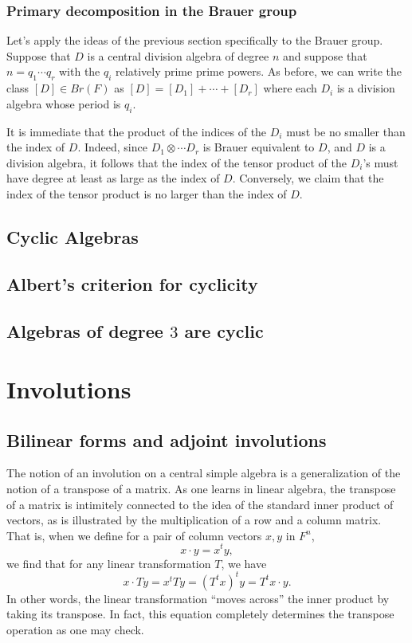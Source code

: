 \documentclass[12pt]{report}
\theoremstyle{plain}
\begin{document}
\subsection{Primary decomposition in the Brauer group}

Let's apply the ideas of the previous section specifically to the Brauer
group. Suppose that $D$ is a central division algebra of degree $n$ and
suppose that $n = q_1 \cdots q_r$ with the $q_i$ relatively prime prime
powers. As before, we can write the class $[D] \in Br(F)$ as $[D] = [D_1] +
\cdots + [D_r]$ where each $D_i$ is a division algebra whose period is
$q_i$.

It is immediate that the product of the indices of the $D_i$ must be no
smaller than the index of $D$. Indeed, since $D_1 \otimes \cdots D_r$ is
Brauer equivalent to $D$, and $D$ is a division algebra, it follows that
the index of the tensor product of the $D_i$'s must have degree at least as
large as the index of $D$. Conversely, we claim that the index of the
tensor product is no larger than the index of $D$. 

\section{Cyclic Algebras}

\section{Albert's criterion for cyclicity}

\section{Algebras of degree $3$ are cyclic}

\chapter{Involutions}

\section{Bilinear forms and adjoint involutions}

The notion of an involution on a central simple algebra is a generalization
of the notion of a transpose of a matrix. As one learns in linear algebra,
the transpose of a matrix is intimitely connected to the idea of the
standard inner product of vectors, as is illustrated by the multiplication
of a row and a column matrix. That is, when we define for a pair of column
vectors $x, y$ in $F^n$,
\[ x \cdot y = x^t y, \]
we find that for any linear transformation $T$, we have
\[ x \cdot Ty = x^t T y = (T^t x)^t y = T^t x \cdot y.\]
In other words, the linear transformation ``moves across'' the inner
product by taking its transpose. In fact, this equation completely
determines the transpose operation as one may check.
\end{document}
